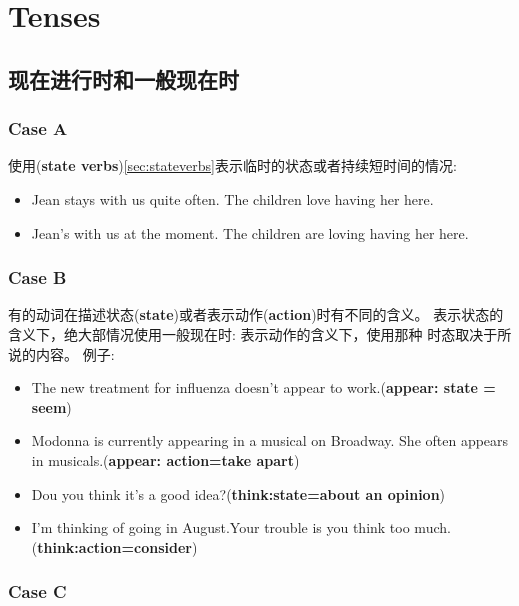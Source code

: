 \chapter{Tenses}

\section{现在进行时和一般现在时}
\label{sec:presentcontsim}

\subsection{Case A}

\noindent
使用({\bf state verbs})\ref{sec:stateverbs}表示临时的状态或者持续短时间的情况:\newline
\begin{itemize}
\item {\example Jean stays with us quite often. The children love having her here.}
\item {\example Jean's with us at the moment. The children are loving having her here.}
\end{itemize}

\subsection{Case B}

\noindent
有的动词在描述状态({\bf state})或者表示动作({\bf action})时有不同的含义。%
表示状态的含义下，绝大部情况使用一般现在时: 表示动作的含义下，使用那种%
时态取决于所说的内容。\newline
\smallskip
例子:\newline
\begin{itemize}
\item {\example The new treatment for influenza doesn't appear to work.({\bf appear:%
state = seem})}
\item {\example Modonna is currently appearing in a musical on Broadway.%
\/She often appears in musicals.({\bf appear: action=take apart})}
\item {\example Dou you think it's a good idea?({\bf think:state=about an opinion})}
\item {\example I'm thinking of going in August.\/Your trouble is you think too much.%
({\bf think:action=consider})}
\end{itemize}

\subsection{Case C}

